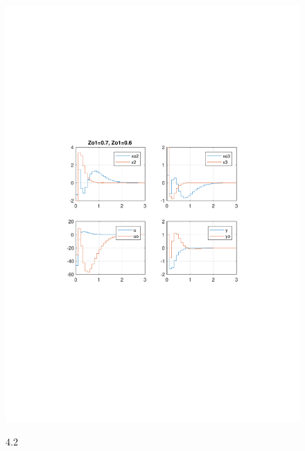 \documentclass{article}
\begin{document}
\begin{figure}[H]
\includegraphics[clip, trim=2cm 10cm 2cm 9.5cm, width=1.00\textwidth]{../rys/zad4_rys2.pdf}
\label{fig:rys4.2}
\caption{4.2}
\end{figure}
\end{document}
